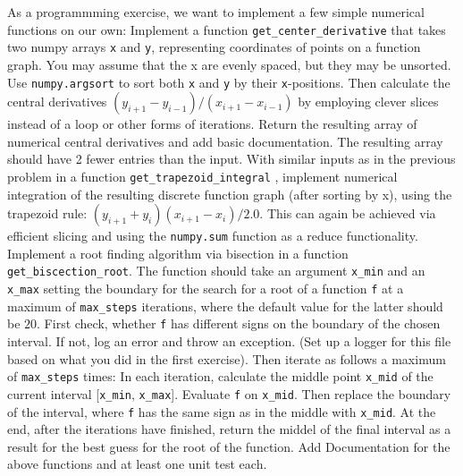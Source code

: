 \documentclass[]{erlangen-problemset}
\begin{document}
\begin{problem}[title={Rebuilding numpy and scipy functionality ourselves}]
As a programmming exercise, we want to implement a few simple numerical functions on our own:
\noindent
\Question Implement a function  \texttt{get\_center\_derivative} that takes two numpy arrays \texttt{x} and \texttt{y}, representing coordinates of points on a function graph. 
You may assume that the x are evenly spaced, but they may be unsorted.
Use  \texttt{numpy.argsort} to sort both  \texttt{x} and  \texttt{y} by their  \texttt{x}-positions.
Then calculate the central derivatives $(y_{i+1}-y_{i-1})/(x_{i+1}-x_{i-1})$ by employing clever slices instead of a loop or other forms of iterations.
Return the resulting array of numerical central derivatives and add basic documentation.
The resulting array should have 2 fewer entries than the input.
\Question With similar inputs as in the previous problem in a function \texttt{get\_trapezoid\_integral} , implement numerical integration of the resulting discrete function graph (after sorting by x), using the trapezoid rule: $(y_{i+1}+y_{i})(x_{i+1}-x_{i})/2.0$.
This can again be achieved via efficient slicing and using the \texttt{numpy.sum} function as a reduce functionality.
\Question Implement a root finding algorithm via bisection in a function \texttt{get\_biscection\_root}. 
The function should take an argument  \texttt{x\_min} and an  \texttt{x\_max} setting the boundary for the search for a root of a function \texttt{f} at a maximum of \texttt{max\_steps} iterations, where the default value for the latter should be $20$.
First check, whether  \texttt{f} has different signs on the boundary of the chosen interval.
If not, log an error and throw an exception. (Set up a logger for this file based on what you did in the first exercise).
Then iterate as follows a maximum of \texttt{max\_steps} times:
In each iteration, calculate the middle point  \texttt{x\_mid} of the current interval  [\texttt{x\_min}, \texttt{x\_max}]. 
Evaluate  \texttt{f} on \texttt{x\_mid}.
Then replace the boundary of the interval, where  \texttt{f} has the same sign as in the middle with  \texttt{x\_mid}.
At the end, after the iterations have finished, return the middel of the final interval as a result for the best guess for the root of the function.
\Question Add Documentation for the above functions and at least one unit test each.
\end{problem}
\end{document}
